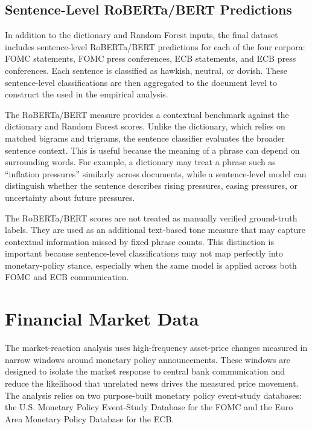 \subsection{Sentence-Level RoBERTa/BERT Predictions}
\label{sec:data_bert_predictions}

In addition to the dictionary and Random Forest inputs, the final dataset
includes sentence-level RoBERTa/BERT predictions for each of the four
corpora: FOMC statements, FOMC press conferences, ECB statements, and ECB
press conferences. Each sentence is classified as hawkish, neutral, or
dovish. These sentence-level classifications are then aggregated to the
document level to construct the \bertscore{} used in the empirical
analysis.

The RoBERTa/BERT measure provides a contextual benchmark against the
dictionary and Random Forest scores. Unlike the dictionary, which relies
on matched bigrams and trigrams, the sentence classifier evaluates the
broader sentence context. This is useful because the meaning of a phrase
can depend on surrounding words. For example, a dictionary may treat a
phrase such as ``inflation pressures'' similarly across documents, while
a sentence-level model can distinguish whether the sentence describes
rising pressures, easing pressures, or uncertainty about future
pressures.

The RoBERTa/BERT scores are not treated as manually verified ground-truth
labels. They are used as an additional text-based tone measure that may
capture contextual information missed by fixed phrase counts. This
distinction is important because sentence-level classifications may not
map perfectly into monetary-policy stance, especially when the same model
is applied across both FOMC and ECB communication.

\section{Financial Market Data}
\label{sec:data_market}

The market-reaction analysis uses high-frequency asset-price changes
measured in narrow windows around monetary policy announcements. These
windows are designed to isolate the market response to central bank
communication and reduce the likelihood that unrelated news drives the
measured price movement. The analysis relies on two purpose-built
monetary policy event-study databases: the U.S. Monetary Policy
Event-Study Database for the FOMC and the Euro Area Monetary Policy
Database for the ECB.

